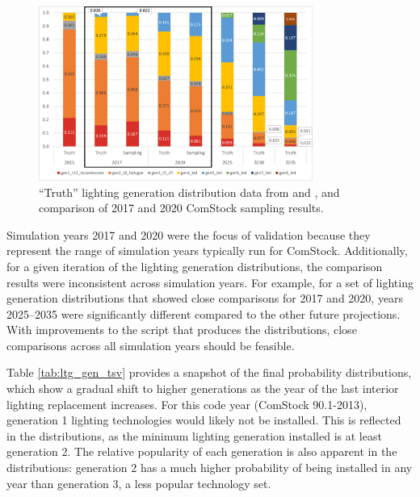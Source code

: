 \begin{figure} [b!]
    \centering \includegraphics[width=0.8\textwidth]{figures/ltg_truth_vs_sampling.png}
    \caption[Interior lighting generation distributions]{``Truth'' lighting generation distribution data from \cite{doe2015lmc} and \cite{doe2019ssl}, and comparison of 2017 and 2020 ComStock sampling results.}
    \label{fig:ltg_compare_dist}
\end{figure}

Simulation years 2017 and 2020 were the focus of validation because they represent the range of simulation years typically run for ComStock. Additionally, for a given iteration of the lighting generation distributions, the comparison results were inconsistent across simulation years. For example, for a set of lighting generation distributions that showed close comparisons for 2017 and 2020, years 2025--2035 were significantly different compared to the other future projections.  With improvements to the script that produces the distributions, close comparisons across all simulation years should be feasible.

Table \ref{tab:ltg_gen_tsv} provides a snapshot of the final probability distributions, which show a gradual shift to higher generations as the year of the last interior lighting replacement increases. For this code year (ComStock 90.1-2013), generation 1 lighting technologies would likely not be installed. This is reflected in the distributions, as the minimum lighting generation installed is at least generation 2.  The relative popularity of each generation is also apparent in the distributions: generation 2 has a much higher probability of being installed in any year than generation 3, a less popular technology set.

%

\pagebreak

